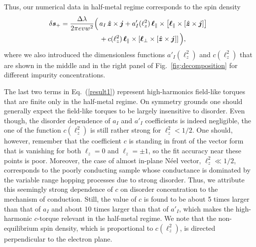 Thus, our numerical data in half-metal regime corresponds to the spin density
\begin{align}
\label{result1}
\delta\boldsymbol{s}_+= \frac{\Delta\lambda}{2\pi evw^2}
\Big(\,&a_I\,\hat{\boldsymbol{z}}\times \boldsymbol{j} + a'_I(\ell_z^2)\,\boldsymbol{\ell}_\parallel\times \left[\boldsymbol{\ell}_\parallel\times \left[\hat{\boldsymbol{z}}\times\boldsymbol{j}\right]\right]\nonumber\\
&+c(\ell_z^2)\,\boldsymbol{\ell}_\parallel\times \left[\boldsymbol{\ell}_\perp\times \left[\hat{\boldsymbol{z}}\times\boldsymbol{j}\right]\right]\Big),
\end{align}
where we also introduced the dimensionless functions $a'_I(\ell_z^2)$ and $c(\ell_z^2)$ that are shown in the middle and in the right panel of Fig.~\ref{fig:decomposition} for different impurity concentrations. 

The last two terms in Eq.~(\ref{result1}) represent high-harmonics field-like torques that are finite only in the half-metal regime. On symmetry grounds one should generally expect the field-like torques to be largely insensitive to disorder. Even though, the disorder dependence of $a_I$ and $a'_I$ coefficients is indeed negligible, the one of the function $c(\ell_z^2)$ is still rather strong for $\ell_z^2<1/2$. One should, however, remember that the coefficient $c$ is standing in front of the vector form that is vanishing for both $\ell_z=0$ and $\ell_z=\pm 1$, so the fit accuracy near these points is poor. Moreover, the case of almost in-plane N\'eel vector, $\ell_z^2\ll 1/2$, corresponds to the poorly conducting sample whose conductance is dominated by the variable range hopping processes due to strong disorder. Thus, we attribute this seemingly strong dependence of $c$ on disorder concentration to the mechanism of conduction. Still, the value of $c$ is found to be about 5 times larger than that of $a_I$ and about 10 times larger than that of $a'_I$, which makes the high-harmonic $c$-torque relevant in the half-metal regime. We note that the non-equilibrium spin density, which is proportional to $c(\ell_z^2)$, is directed perpendicular to the electron plane.  

